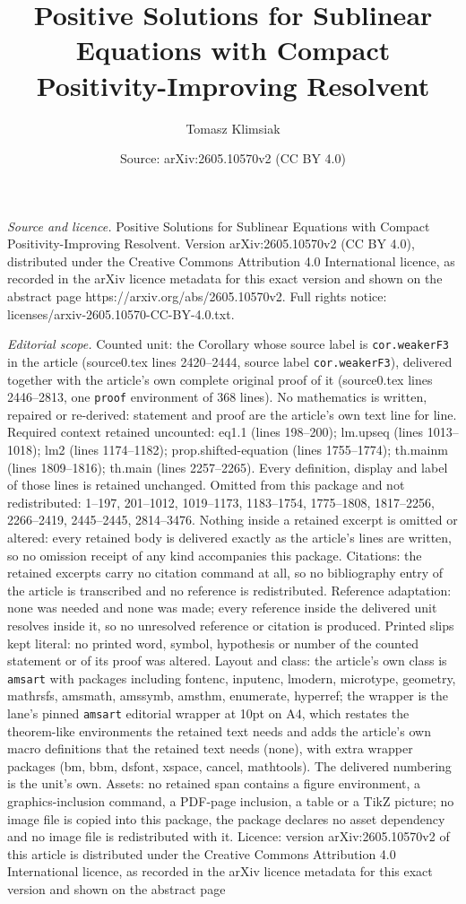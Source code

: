 \documentclass[10pt,a4paper]{amsart}
\title[Positive Solutions for Sublinear Equations with Compact Posi]{Positive Solutions for Sublinear Equations with Compact Positivity-Improving Resolvent}
\author{Tomasz Klimsiak}
\date{Source: arXiv:2605.10570v2 (CC BY 4.0)}
\begin{document}
\maketitle

\noindent\emph{Source and licence.} Positive Solutions for Sublinear Equations with Compact Positivity-Improving Resolvent. Version arXiv:2605.10570v2 (CC BY 4.0), distributed under the Creative Commons Attribution 4.0 International licence, as recorded in the arXiv licence metadata for this exact version and shown on the abstract page https://arxiv.org/abs/2605.10570v2. Full rights notice: licenses/arxiv-2605.10570-CC-BY-4.0.txt.\par\smallskip

\noindent\textit{Editorial scope.} Counted unit: the Corollary whose source label is \texttt{cor.weakerF3} in the article (source0.tex lines 2420--2444, source label \texttt{cor.weakerF3}), delivered together with the article's own complete original proof of it (source0.tex lines 2446--2813, one \texttt{proof} environment of 368 lines). No mathematics is written, repaired or re-derived: statement and proof are the article's own text line for line. Required context retained uncounted: eq1.1 (lines 198--200); lm.upseq (lines 1013--1018); lm2 (lines 1174--1182); prop.shifted-equation (lines 1755--1774); th.mainm (lines 1809--1816); th.main (lines 2257--2265). Every definition, display and label of those lines is retained unchanged. Omitted from this package and not redistributed: 1--197, 201--1012, 1019--1173, 1183--1754, 1775--1808, 1817--2256, 2266--2419, 2445--2445, 2814--3476. Nothing inside a retained excerpt is omitted or altered: every retained body is delivered exactly as the article's lines are written, so no omission receipt of any kind accompanies this package. Citations: the retained excerpts carry no citation command at all, so no bibliography entry of the article is transcribed and no reference is redistributed. Reference adaptation: none was needed and none was made; every reference inside the delivered unit resolves inside it, so no unresolved reference or citation is produced. Printed slips kept literal: no printed word, symbol, hypothesis or number of the counted statement or of its proof was altered. Layout and class: the article's own class is \texttt{amsart} with packages including fontenc, inputenc, lmodern, microtype, geometry, mathrsfs, amsmath, amssymb, amsthm, enumerate, hyperref; the wrapper is the lane's pinned \texttt{amsart} editorial wrapper at 10pt on A4, which restates the theorem-like environments the retained text needs and adds the article's own macro definitions that the retained text needs (none), with extra wrapper packages (bm, bbm, dsfont, xspace, cancel, mathtools). The delivered numbering is the unit's own. Assets: no retained span contains a figure environment, a graphics-inclusion command, a PDF-page inclusion, a table or a TikZ picture; no image file is copied into this package, the package declares no asset dependency and no image file is redistributed with it. Licence: version arXiv:2605.10570v2 of this article is distributed under the Creative Commons Attribution 4.0 International licence, as recorded in the arXiv licence metadata for this exact version and shown on the abstract page 
\end{document}
